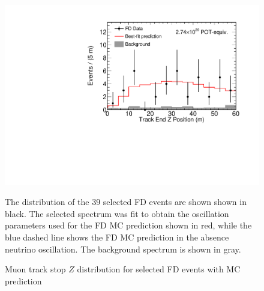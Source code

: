 \begin{figure}
\begin{center}
\includegraphics[width=\textwidth]{figures/results/fd_data_mc_numi_plots/trkEndZ_unblind.pdf}
\end{center}
\caption{ Muon track stop $Z$ distribution for selected FD events with MC prediction }{
The distribution of the 39 selected FD events are shown shown in black.
The selected spectrum was fit to obtain the oscillation parameters used
for the FD MC prediction shown in red, while
the blue dashed line shows the FD MC prediction in the absence neutrino
oscillation.
The background spectrum is shown in gray.
}
\label{trkEndZ_unblind}

\end{figure}




